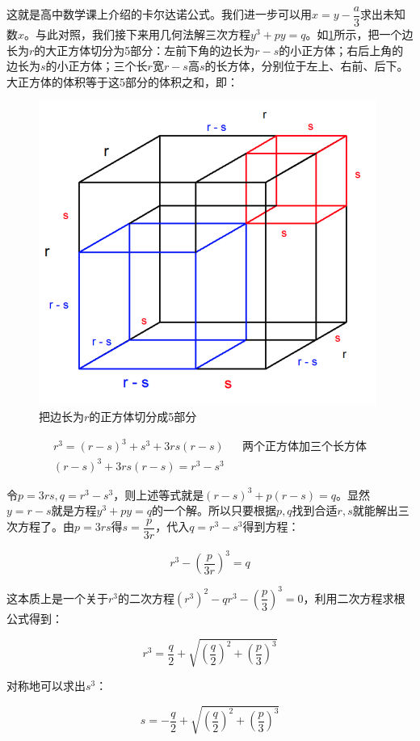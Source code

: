 \documentclass[b5paper]{ctexart}
\begin{document}
这就是高中数学课上介绍的卡尔达诺公式。我们进一步可以用$x = y - \dfrac{a}{3}$求出未知数$x$。与此对照，我们接下来用几何法解三次方程$y^3 + py = q$。如\cref{fig:cube-decompose}所示，把一个边长为$r$的大正方体切分为5部分：左前下角的边长为$r-s$的小正方体；右后上角的边长为$s$的小正方体；三个长$r$宽$r-s$高$s$的长方体，分别位于左上、右前、后下。大正方体的体积等于这5部分的体积之和，即：

\begin{figure}[htbp]
  \centering
  \includegraphics[scale=0.4]{img/cube-decompose}
  \caption{把边长为$r$的正方体切分成5部分}
 \label{fig:cube-decompose}
\end{figure}

\begin{align*}
r^3 = (r-s)^3 + s^3 + 3rs(r-s)  &&\text{两个正方体加三个长方体} \\
(r-s)^3 + 3rs(r-s) = r^3 - s^3
\end{align*}

令$p = 3rs, q = r^3 - s^3$，则上述等式就是$(r-s)^3 + p(r-s) = q$。显然$y = r - s$就是方程$y^3 + py = q$的一个解。所以只要根据$p, q$找到合适$r, s$就能解出三次方程了。由$p = 3rs$得$s = \dfrac{p}{3r}$，代入$q = r^3 - s^3$得到方程：

\[
r^3 - (\frac{p}{3r})^3 = q
\]

这本质上是一个关于$r^3$的二次方程$(r^3)^2 - qr^3 - (\dfrac{p}{3})^3 = 0$，利用二次方程求根公式得到：

\[
r^3 = \frac{q}{2} + \sqrt{(\frac{q}{2})^2 + (\frac{p}{3})^3}
\]

对称地可以求出$s^3$：

\[
s = -\frac{q}{2} + \sqrt{(\dfrac{q}{2})^2 + (\dfrac{p}{3})^3}
\]
\end{document}
